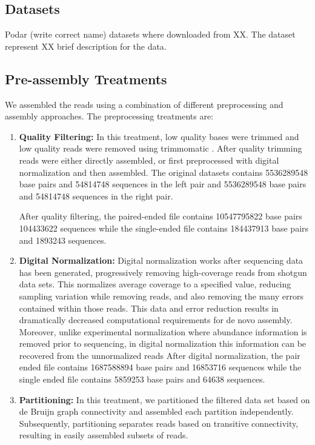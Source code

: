\subsection*{Datasets}


Podar (write correct name) datasets where downloaded from XX. The dataset represent XX brief description for the data. 

\subsection*{Pre-assembly Treatments  }

We assembled the reads using a combination of different preprocessing and assembly approaches.  The preprocessing treatments are:
\begin{enumerate}
 \item {\bf Quality Filtering:} In this treatment, low quality bases were trimmed and low quality reads were removed using trimmomatic \cite{trimmomatic}. After quality trimming reads were either directly assembled, or first
 preprocessed with digital normalization and then assembled.
The original datasets contains  5536289548 base pairs  and 54814748 sequences in the  left pair and 5536289548 base pairs  and 54814748 sequences in the right pair. 

After quality filtering, the paired-ended file contains 10547795822  base pairs 104433622 sequences while the single-ended file contains  184437913 base pairs and 1893243 sequences. 

 \item {\bf Digital Normalization:} Digital normalization works after sequencing data has been generated, progressively
removing high-coverage reads from shotgun data sets. This normalizes average coverage to a
specified value, reducing sampling variation while removing reads, and also removing the many errors
contained within those reads. This data and error reduction results in dramatically decreased computational
requirements for de novo assembly. Moreover, unlike experimental normalization where abundance
information is removed prior to sequencing, in digital normalization this information can be recovered
from the unnormalized reads \cite{Brown2012}
After digital normalization, the pair ended file contains 1687588894 base pairs and 16853716 sequences  while the single ended file contains 5859253 base pairs and 64638 sequences. 

 \item {\bf Partitioning:} In this treatment,  we partitioned the filtered data set based on de Bruijn graph connectivity and assembled each partition independently.  Subsequently, partitioning
separates reads based on transitive connectivity, resulting in easily assembled subsets of
reads.
 
\end{enumerate}


